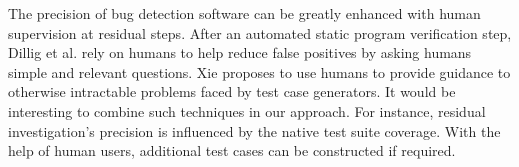 The precision of bug detection software can be greatly enhanced with
human supervision at residual steps.  After an automated static
program verification step, Dillig et al. \cite{Dillig:2012:AED:2254064.2254087}
rely on humans to help reduce false positives by asking humans simple
and relevant questions.  Xie \cite{Xie2012SCAM} proposes to use humans to
provide guidance to otherwise intractable problems faced by test case
generators.  It would be interesting to combine such techniques in our
approach.  For instance, residual investigation's precision is
influenced by the native test suite coverage.  With the help of human
users, additional test cases can be constructed if required.
